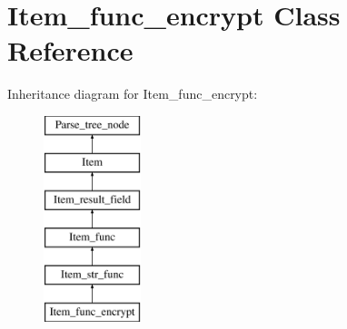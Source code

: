 \hypertarget{classItem__func__encrypt}{}\section{Item\+\_\+func\+\_\+encrypt Class Reference}
\label{classItem__func__encrypt}
Inheritance diagram for Item\+\_\+func\+\_\+encrypt\+:\begin{figure}[H]
\begin{center}
\leavevmode
\includegraphics[height=6.000000cm]{classItem__func__encrypt}
\end{center}
\end{figure}

